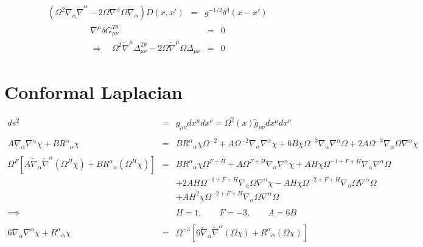 \documentclass[10pt,letterpaper]{article}
\numberwithin{equation}{section}
\begin{document}
\begin{eqnarray}
\left( \Omega^2 \tilde\nabla_\alpha \tilde\nabla^\alpha - 2\Omega \nabla^\alpha \Omega \tilde\nabla_\alpha \right) D(x,x') &=&g^{-1/2}\delta^4(x-x')
\end{eqnarray}
\begin{eqnarray}
\nabla^\mu \delta G_{\mu\nu}^{T\theta} &=&0
\nonumber\\
\Rightarrow\quad  \Omega^2 \tilde\nabla^\mu \Delta_{\mu\nu}^{T\theta} - 2\Omega \tilde\nabla^\mu \Omega \Delta_{\mu\nu} &=& 0
\end{eqnarray}
%
%
\section{ Conformal Laplacian}
\begin{eqnarray}
ds^2 &=& g_{\mu\nu} dx^\mu dx^\nu = \Omega^2(x) \tilde g_{\mu\nu} dx^\mu dx^\nu
\\ \nonumber\\
A \nabla_\alpha \nabla^\alpha \chi + B R^\alpha{}_\alpha \chi
&=& B R^\alpha{}_\alpha \chi \Omega^{-2} + A \Omega^{-2} \nabla_{\alpha }\nabla^{\alpha }\chi + 6 B \chi \Omega^{-3} \nabla_{\alpha }\nabla^{\alpha }\Omega + 2 A \Omega^{-3} \nabla_{\alpha }\Omega \nabla^{\alpha }\chi 
\nonumber\\ \\
\Omega^{F}\left[A \tilde\nabla_\alpha\tilde\nabla^\alpha( \Omega^H \chi) + B R^\alpha{}_\alpha (\Omega^H \chi)\right]
&=& B R^\alpha{}_\alpha \chi \Omega^{F + H}
+ A \Omega^{F + H} \nabla_{\alpha }\nabla^{\alpha }\chi
+ A H \chi \Omega^{-1 + F + H} \nabla_{\alpha }\nabla^{\alpha }\Omega
\nonumber\\
&&
+ 2 A H \Omega^{-1 + F + H} \nabla_{\alpha }\Omega \nabla^{\alpha }\chi -  A H \chi \Omega^{-2 + F + H} \nabla_{\alpha }\Omega \nabla^{\alpha }\Omega
\nonumber\\
&&
+ A H^2 \chi \Omega^{-2 + F + H} \nabla_{\alpha }\Omega \nabla^{\alpha }\Omega
\\ \nonumber\\
\implies && H=1,\qquad F=-3,\qquad A=6B
\\ \nonumber\\
6 \nabla_\alpha \nabla^\alpha \chi + R^\alpha{}_\alpha \chi
&=& \Omega^{-3} \left[ 6 \tilde \nabla_\alpha \tilde \nabla^\alpha (\Omega\chi) + R^\alpha{}_\alpha (\Omega \chi) \right]
\end{eqnarray}
\end{document}
